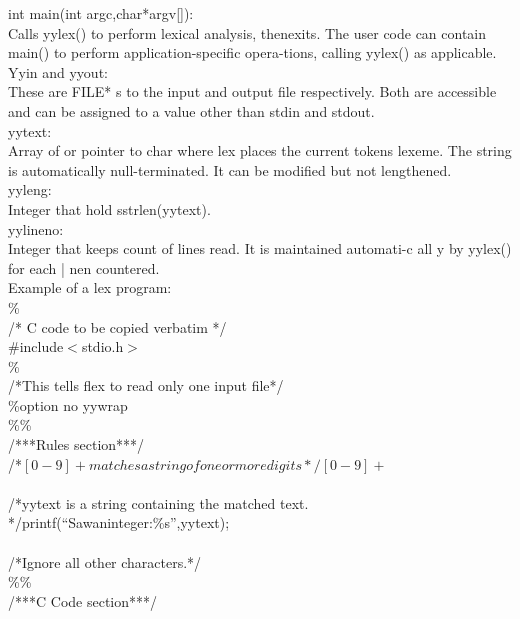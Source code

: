 \documentclass[11pt]{article}
\begin{document}
	\noindent
	int main(int argc,char*argv[]):\\
	Calls yylex()  to perform lexical analysis, thenexits. The user code can contain main() to perform application-specific opera-tions, calling yylex() as applicable.\\
	
	\noindent
	Yyin and yyout:\\
	These are FILE* s to the input and output file respectively. Both are accessible and can be assigned to a value other than stdin and stdout.\\
	
	\noindent
	yytext:\\
	Array of or pointer to char where lex places the current tokens lexeme. The string is automatically null-terminated. It can be modified but not lengthened.\\
	
	\noindent
	yyleng:\\
	Integer that hold sstrlen(yytext).\\
	
	\noindent
	yylineno:\\
	Integer that keeps count of lines read. It is maintained automati-c all y by yylex() for each | nen countered.\\
	
	\noindent
	Example of a lex program:\\
	
	\%{\\
		/* C code to be copied verbatim */ \\
		\#include$<$stdio.h$>$\\
		\%}\\
	
	/*This tells flex to read only one input file*/\\
	\%option no yywrap\\
	
	\%\%\\
	/***Rules section***/\\
	
	/*$[0-9]+matches a string of one or more digits*/[0-9]+$\\
	{\\
		/*yytext is a string containing the matched text.  */printf(“Sawaninteger:\%s”,yytext);\\
	}\\
	{/*Ignore all other characters.*/}\\
	
	\%\%\\
	/***C Code section***/\\
	
\end{document}
